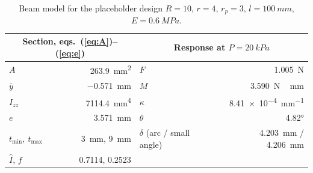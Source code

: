 \documentclass[12pt,a4paper,oneside]{report}
\numberwithin{equation}{chapter}
\numberwithin{figure}{chapter}
\numberwithin{table}{chapter}
\newcommand{\Izz}{I_{zz}}
\newcommand{\rp}{r_p}
\newcommand{\tmin}{t_{\min}}
\newcommand{\tmax}{t_{\max}}
\begin{document}
\begin{table}[H]
\centering\small
\caption[Beam model for the placeholder design]{Beam model for the placeholder design $R=10$, $r=4$, $\rp=3$, $l=\SI{100}{mm}$, $E=\SI{0.6}{MPa}$.}
\label{tab:example}
\begin{tabular}{@{}lr@{\qquad}lr@{}}
\toprule
\multicolumn{2}{c}{Section, eqs.~(\ref{eq:A})--(\ref{eq:e})} & \multicolumn{2}{c}{Response at $P=\SI{20}{kPa}$}\\
\midrule
$A$ & \SI{263.9}{mm^2} & $F$ & \SI{1.005}{N}\\
$\bar y$ & \SI{-0.571}{mm} & $M$ & \SI{3.590}{N\,mm}\\
$\Izz$ & \SI{7114.4}{mm^4} & $\kappa$ & \SI{8.41e-4}{mm^{-1}}\\
$e$ & \SI{3.571}{mm} & $\theta$ & \ang{4.82}\\
$\tmin,\ \tmax$ & \SI{3}{mm}, \SI{9}{mm} & $\delta$ (arc / small angle) & \SI{4.203}{mm} / \SI{4.206}{mm}\\
$\hat I$, $f$ & 0.7114, 0.2523 & & \\
\bottomrule
\end{tabular}
\end{table}
\end{document}
